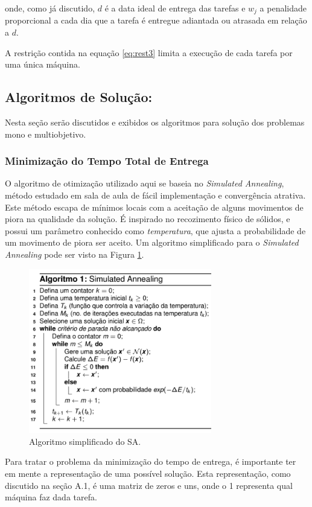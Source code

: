 \documentclass[conference]{IEEEtran}
\begin{document}
onde, como já discutido, $d$ é a data ideal de entrega das tarefas e $w_j$ a penalidade proporcional a cada dia que a tarefa é entregue adiantada ou atrasada em relação a $d$.

A restrição contida na equação \ref{eq:rest3} limita a execução de cada tarefa por uma única máquina.

\subsection{Algoritmos de Solução:}
Nesta seção serão discutidos e exibidos os algoritmos para solução dos problemas mono e multiobjetivo.
\subsubsection{Minimização do Tempo Total de Entrega}
O algoritmo de otimização utilizado aqui se baseia no \textit{Simulated Annealing}, método estudado em sala de aula de fácil implementação e convergência atrativa. Este método escapa de mínimos locais com a aceitação de alguns movimentos de piora na qualidade da solução. É inspirado no recozimento físico de sólidos, e possui um parâmetro conhecido como \textit{temperatura}, que ajusta a probabilidade de um movimento de piora ser aceito. Um algoritmo simplificado para o \textit{Simulated Annealing} pode ser visto na Figura \ref{fig:algoritmo}.

	\begin{figure}[h]
		\includegraphics[width=8cm]{img/sa.png}
		\caption{Algoritmo simplificado do SA.}
		\label{fig:algoritmo}
	\end{figure}
	
Para tratar o problema da minimização do tempo de entrega, é importante ter em mente a representação de uma possível solução. Esta representação, como discutido na seção A.1, é uma matriz de zeros e uns, onde o 1 representa qual máquina faz dada tarefa.
\end{document}
